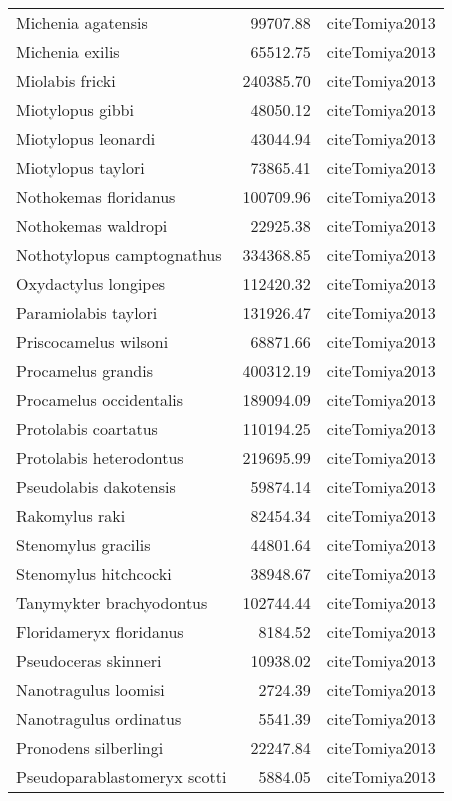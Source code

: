 \begin{table}[ht]
\begin{tabular}{lrl}
  Michenia agatensis & 99707.88 & cite{Tomiya2013} \\ 
  Michenia exilis & 65512.75 & cite{Tomiya2013} \\ 
  Miolabis fricki & 240385.70 & cite{Tomiya2013} \\ 
  Miotylopus gibbi & 48050.12 & cite{Tomiya2013} \\ 
  Miotylopus leonardi & 43044.94 & cite{Tomiya2013} \\ 
  Miotylopus taylori & 73865.41 & cite{Tomiya2013} \\ 
  Nothokemas floridanus & 100709.96 & cite{Tomiya2013} \\ 
  Nothokemas waldropi & 22925.38 & cite{Tomiya2013} \\ 
  Nothotylopus camptognathus & 334368.85 & cite{Tomiya2013} \\ 
  Oxydactylus longipes & 112420.32 & cite{Tomiya2013} \\ 
  Paramiolabis taylori & 131926.47 & cite{Tomiya2013} \\ 
  Priscocamelus wilsoni & 68871.66 & cite{Tomiya2013} \\ 
  Procamelus grandis & 400312.19 & cite{Tomiya2013} \\ 
  Procamelus occidentalis & 189094.09 & cite{Tomiya2013} \\ 
  Protolabis coartatus & 110194.25 & cite{Tomiya2013} \\ 
  Protolabis heterodontus & 219695.99 & cite{Tomiya2013} \\ 
  Pseudolabis dakotensis & 59874.14 & cite{Tomiya2013} \\ 
  Rakomylus raki & 82454.34 & cite{Tomiya2013} \\ 
  Stenomylus gracilis & 44801.64 & cite{Tomiya2013} \\ 
  Stenomylus hitchcocki & 38948.67 & cite{Tomiya2013} \\ 
  Tanymykter brachyodontus & 102744.44 & cite{Tomiya2013} \\ 
  Floridameryx floridanus & 8184.52 & cite{Tomiya2013} \\ 
  Pseudoceras skinneri & 10938.02 & cite{Tomiya2013} \\ 
  Nanotragulus loomisi & 2724.39 & cite{Tomiya2013} \\ 
  Nanotragulus ordinatus & 5541.39 & cite{Tomiya2013} \\ 
  Pronodens silberlingi & 22247.84 & cite{Tomiya2013} \\ 
  Pseudoparablastomeryx scotti & 5884.05 & cite{Tomiya2013} \\ 

\end{tabular}
\end{table}
